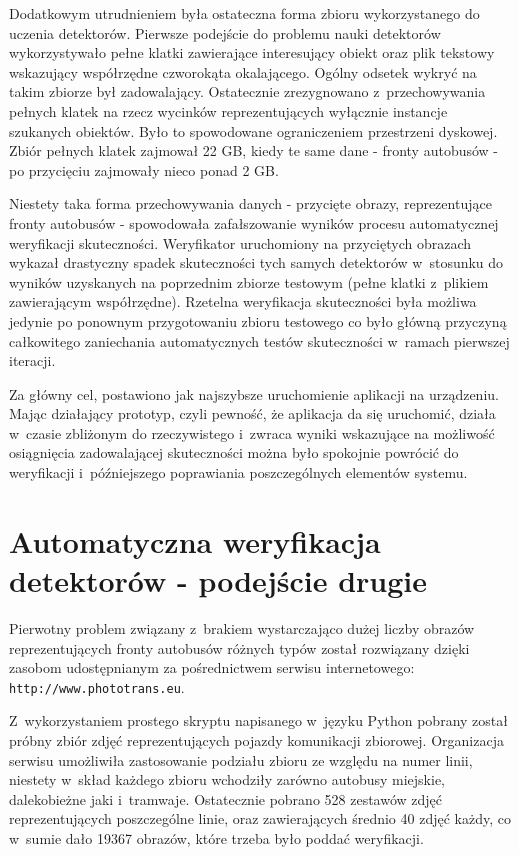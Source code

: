 Dodatkowym utrudnieniem była ostateczna forma zbioru wykorzystanego 
do uczenia detektorów. Pierwsze podejście do problemu nauki 
detektorów wykorzystywało pełne klatki zawierające interesujący obiekt
oraz plik tekstowy wskazujący współrzędne czworokąta okalającego.
Ogólny odsetek wykryć na takim zbiorze był zadowalający. 
Ostatecznie zrezygnowano z~przechowywania pełnych klatek na rzecz
wycinków reprezentujących wyłącznie instancje szukanych obiektów.
Było to spowodowane ograniczeniem przestrzeni dyskowej. Zbiór pełnych
klatek zajmował 22 GB, kiedy te same dane - fronty autobusów - po
przycięciu zajmowały nieco ponad 2 GB.

Niestety taka forma przechowywania danych 
- przycięte obrazy, reprezentujące fronty autobusów - spowodowała zafałszowanie 
wyników procesu automatycznej weryfikacji skuteczności.
Weryfikator uruchomiony na przyciętych obrazach wykazał
drastyczny spadek skuteczności tych samych detektorów w~stosunku
do wyników uzyskanych na poprzednim zbiorze testowym (pełne klatki
z~plikiem zawierającym współrzędne).
Rzetelna weryfikacja skuteczności była możliwa jedynie po ponownym przygotowaniu
zbioru testowego co było główną przyczyną 
całkowitego zaniechania automatycznych testów skuteczności
w~ramach pierwszej iteracji.


Za główny cel, postawiono jak najszybsze uruchomienie
aplikacji na urządzeniu. Mając działający prototyp, czyli
pewność, że aplikacja da się uruchomić, działa w~czasie zbliżonym
do rzeczywistego i~zwraca wyniki wskazujące na możliwość
osiągnięcia zadowalającej skuteczności można było spokojnie 
powrócić do weryfikacji i~późniejszego poprawiania
poszczególnych elementów systemu.

\section{Automatyczna weryfikacja detektorów - podejście drugie}

Pierwotny problem związany z~brakiem wystarczająco dużej liczby
obrazów reprezentujących fronty autobusów różnych typów został
rozwiązany dzięki zasobom udostępnianym za pośrednictwem serwisu
internetowego: \verb|http://www.phototrans.eu|.

Z~wykorzystaniem prostego skryptu napisanego w~języku Python pobrany
został próbny zbiór zdjęć reprezentujących pojazdy komunikacji
zbiorowej. Organizacja serwisu umożliwiła zastosowanie
podziału zbioru ze względu na numer linii, niestety
w~skład każdego zbioru wchodziły zarówno autobusy miejskie, dalekobieżne
jaki i~tramwaje. Ostatecznie pobrano 528 zestawów zdjęć reprezentujących
poszczególne linie, oraz zawierających średnio 40 zdjęć każdy, co
w~sumie dało 19367 obrazów, które trzeba było poddać weryfikacji.

